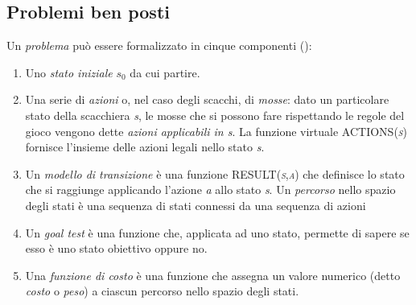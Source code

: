 \subsection{Problemi ben posti}
Un \emph{problema} può essere formalizzato in cinque componenti (\cite{randw}):
\begin{enumerate}
   \item Uno \emph{stato iniziale} $s_0$ da cui partire.
   \item Una serie di \emph{azioni} o, nel caso degli scacchi, di \emph{mosse}: dato un particolare stato della scacchiera \emph{s}, le mosse che si possono fare rispettando le regole del gioco vengono dette \emph{azioni applicabili in \emph{s}}. La funzione virtuale \textsc{ACTIONS(\emph{s})} fornisce l'insieme delle azioni legali nello stato \emph{s}.
   \item Un \emph{modello di transizione} è una funzione \textsc{RESULT(\emph{s},\emph{a})} che definisce lo stato che si raggiunge applicando l'azione \emph{a} allo stato \emph{s}.
Un \emph{percorso} nello spazio degli stati è una sequenza di stati connessi da una sequenza di azioni
   \item Un \emph{goal test} è una funzione che, applicata ad uno stato, permette di sapere se esso è uno stato obiettivo oppure no.
   \item Una \emph{funzione di costo} è una funzione che assegna un valore numerico (detto \emph{costo} o \emph{peso}) a ciascun percorso nello spazio degli stati.
\end{enumerate}

